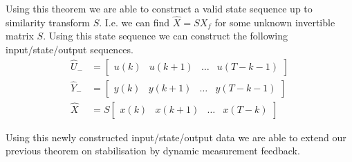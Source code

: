 
Using this theorem we are able to construct a valid state sequence up to similarity transform $S$. I.e. we can find $\hat{X} = S X_f$ for some unknown invertible matrix $S$. Using this state sequence we can construct the following input/state/output sequences.
\begin{subequations} \label{StateExtimationData}
	\begin{align*}
		\hat{U}_- &= \begin{bmatrix} u(k) & u(k+1) & \dots & u(T-k-1) \end{bmatrix} \\
		\hat{Y}_- &= \begin{bmatrix} y(k) & y(k+1) & \dots & y(T-k-1) \end{bmatrix} \\
		\hat{X} &= S \begin{bmatrix} x(k) & x(k+1) & \dots & x(T-k) \end{bmatrix} 
	\end{align*}
\end{subequations}


Using this newly constructed input/state/output data we are able to extend our previous theorem on stabilisation by dynamic measurement feedback.

